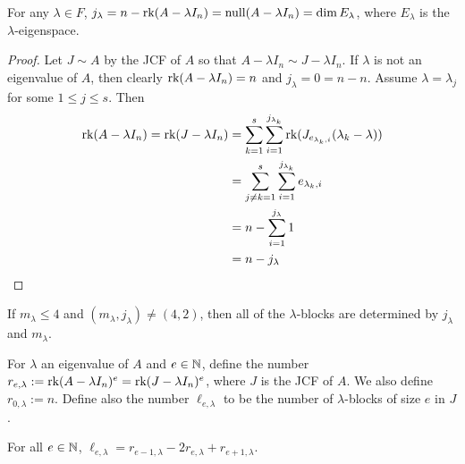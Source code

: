 \documentclass[11pt]{book}
\theoremstyle{definition}   \newtheorem{defn}[counter]{Definition} %
\newcommand{\vs}{\vspace{8pt}}
\numberwithin{counter}{chapter}
\begin{document}
\begin{lemma}
For any $\lambda \in F$, $j_\lambda = n - \textnormal{rk}(A - \lambda I_n) = \textnormal{null}(A - \lambda I_n) = \dim E_\lambda$, where $E_\lambda$ is the $\lambda$-eigenspace. 
\end{lemma}

\begin{proof}
Let $J \sim A$ by the JCF of $A$ so that $A - \lambda I_n \sim J - \lambda I_n$. If $\lambda$ is not an eigenvalue of $A$, then clearly $\textnormal{rk}(A - \lambda I_n) = n$ and $j_\lambda = 0 = n - n$. Assume $\lambda = \lambda_j$ for some $1 \leq j \leq s$. Then
\begin{align*}
\textnormal{rk}(A - \lambda I_n) = \textnormal{rk}(J - \lambda I_n) &= \sum_{k=1}^s \sum_{i=1}^{j_{\lambda_k}} \textnormal{rk}(J_{e_{\lambda_k,i}}(\lambda_k-\lambda)) \\
&= \sum_{j \ne k = 1}^{s} \sum_{i=1}^{j_{\lambda_k}} e_{\lambda_k,i} \\
&= n - \sum_{i=1}^{j_\lambda} 1 \\
&= n - j_\lambda
\end{align*}
\end{proof}

\vs

\begin{remark}
If $m_\lambda \leq 4$ and $(m_\lambda,j_\lambda) \ne (4,2)$, then all of the $\lambda$-blocks are determined by $j_\lambda$ and $m_\lambda$. 
\end{remark}

\vs

For $\lambda$ an eigenvalue of $A$ and $e \in \operatorname{\mathbb{N}}$, define the number $r_{e,\lambda} := \textnormal{rk}(A-\lambda I_n)^e = \textnormal{rk}(J-\lambda I_n)^e$, where $J$ is the JCF of $A$. We also define $r_{0,\lambda} := n$. Define also the number $\ell_{e,\lambda}$ to be the number of $\lambda$-blocks of size $e$ in $J$. 

\vs

\begin{lemma}
For all $e \in \operatorname{\mathbb{N}}$, $\ell_{e,\lambda} = r_{e-1,\lambda} - 2 r_{e,\lambda} + r_{e+1,\lambda}$. 
\end{lemma}
\end{document}
